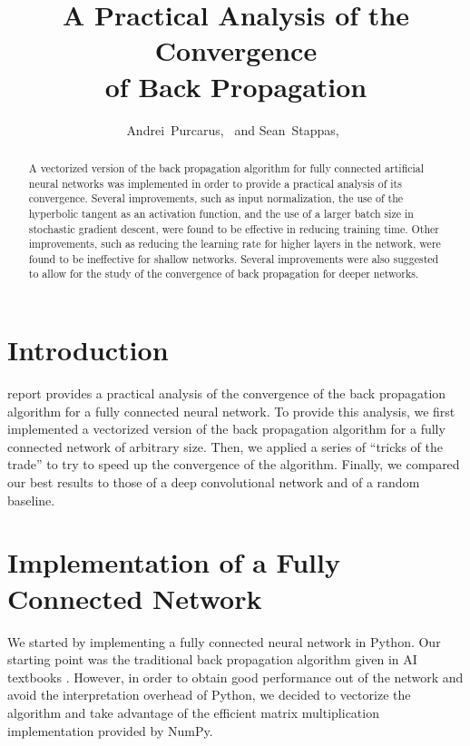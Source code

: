 \documentclass[journal,hidelinks]{IEEEtran}
\title{A Practical Analysis of the Convergence \\ of Back Propagation}
\author{Andrei~Purcarus,~\IEEEmembership{McGill~University} and Sean~Stappas,~\IEEEmembership{McGill~University}}
\begin{document}
\sloppy

\maketitle

\begin{abstract}

A vectorized version of the back propagation algorithm for fully connected artificial neural networks was implemented in order to provide a practical analysis of its convergence. Several improvements, such as input normalization, the use of the hyperbolic tangent as an activation function, and the use of a larger batch size in stochastic gradient descent, were found to be effective in reducing training time. Other improvements, such as reducing the learning rate for higher layers in the network, were found to be ineffective for shallow networks. Several improvements were also suggested to allow for the study of the convergence of back propagation for deeper networks.

\end{abstract}

\section{Introduction}

 report provides a practical analysis of the convergence of the back propagation algorithm for a fully connected neural network. To provide this analysis, we first implemented a vectorized version of the back propagation algorithm for a fully connected network of arbitrary size. Then, we applied a series of ``tricks of the trade'' to try to speed up the convergence of the algorithm. Finally, we compared our best results to those of a deep convolutional network and of a random baseline.

\section{Implementation of a Fully Connected Network}

We started by implementing a fully connected neural network in Python. Our starting point was the traditional back propagation algorithm given in AI textbooks \cite{russell_ai_2009}. However, in order to obtain good performance out of the network and avoid the interpretation overhead of Python, we decided to vectorize the algorithm and take advantage of the efficient matrix multiplication implementation provided by NumPy.
\end{document}
